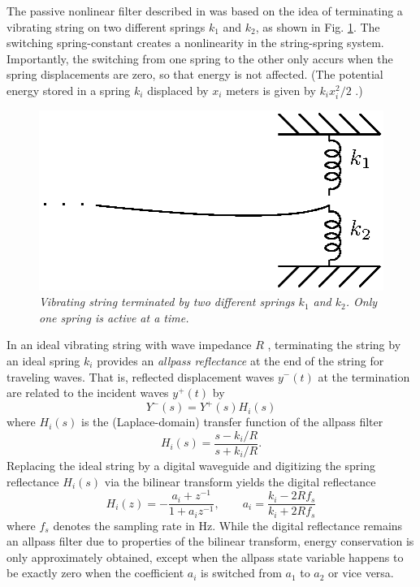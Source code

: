 \documentclass[twoside,a4paper]{article}
\newcommand{\zi}{z^{-1}}
\begin{document}
The passive nonlinear filter described in \cite{PierceAndVanDuyne97}
was based on the idea of terminating a vibrating string on two
different springs $k_1$ and $k_2$, as shown in Fig.{}
\ref{stringk1k2}.  The switching spring-constant creates a
nonlinearity in the string-spring system.  Importantly, the switching
from one spring to the other only accurs when the spring displacements
are zero, so that energy is not affected.  (The potential energy
stored in a spring $k_i$ displaced by $x_i$ meters is given by
$k_ix_i^2/2$ \cite{PASP}.)

\begin{figure}[ht]
\centerline{\includegraphics[scale=0.8]{eps/stringk1k2.eps}}
\caption{\label{stringk1k2}{\it Vibrating string terminated by two
    different springs $k_1$ and $k_2$. Only one spring is active at a
    time.}}
\end{figure}

In an ideal vibrating string with wave impedance $R$ \cite{PASP},
terminating the string by an ideal spring $k_i$ provides an
\emph{allpass reflectance} at the end of the string for traveling
waves.  That is, reflected displacement waves $y^-(t)$ at the
termination are related to the incident waves $y^+(t)$ by
\[
Y^-(s) = Y^+(s) H_i(s) 
\]
where $H_i(s)$ is the (Laplace-domain) transfer function of the allpass filter
\[
H_i(s) = \frac{s-k_i/R}{s+k_i/R}.
\]
Replacing the ideal string by a digital waveguide \cite{PASP} and 
digitizing the spring reflectance $H_i(s)$ via the bilinear transform
yields the digital reflectance
\[
H_i(z) = -\frac{a_i+\zi}{1+a_i\zi},\qquad a_i=\frac{k_i-2Rf_s}{k_i+2Rf_s}
\]
where $f_s$ denotes the sampling rate in Hz.  While the digital
reflectance remains an allpass filter due to properties of the
bilinear transform, energy conservation is only
approximately obtained, except when the allpass state variable happens
to be exactly zero when the coefficient $a_i$ is switched from $a_1$ to
$a_2$ or vice versa.
\end{document}
